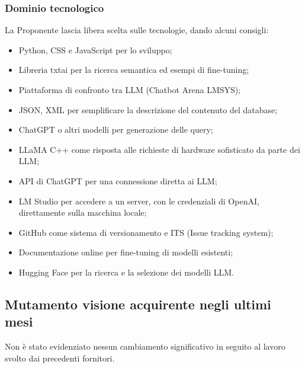 \subsubsection{Dominio tecnologico}
La Proponente lascia libera scelta sulle tecnologie, dando alcuni consigli:
\begin{itemize}
  \item Python, CSS e JavaScript per lo sviluppo;
  \item Libreria txtai per la ricerca semantica ed esempi di fine-tuning; 
  \item Piattaforma di confronto tra LLM (Chatbot Arena LMSYS);
  \item JSON, XML per semplificare la descrizione del contenuto del database;
  \item ChatGPT o altri modelli per generazione delle query;
  \item LLaMA C++ come risposta alle richieste di hardware sofisticato da parte dei LLM;
  \item API di ChatGPT per una connessione diretta ai LLM;
  \item LM Studio per accedere a un server, con le credenziali di OpenAI, direttamente sulla macchina locale;
  \item GitHub come sistema di versionamento e ITS (Issue tracking system);
  \item Documentazione online per fine-tuning di modelli esistenti;
  \item Hugging Face per la ricerca e la selezione dei modelli LLM.
\end{itemize}

\subsection{Mutamento visione acquirente negli ultimi mesi}
Non è stato evidenziato nessun cambiamento significativo in seguito al lavoro svolto dai precedenti fornitori.

